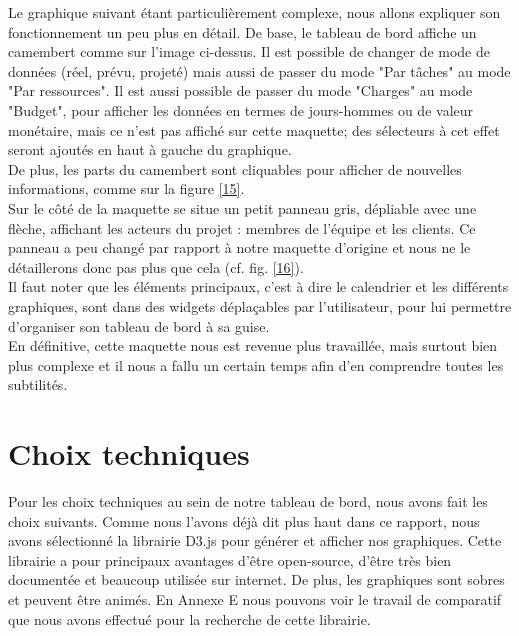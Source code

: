 \documentclass[12pt]{report}
\begin{document}
Le graphique suivant étant particulièrement complexe, nous allons expliquer son fonctionnement un peu plus en détail. De base, le tableau de bord affiche un camembert comme sur l'image ci-dessus. Il est possible de changer de mode de données (réel, prévu, projeté) mais aussi de passer du mode "Par tâches" au mode "Par ressources". Il est aussi possible de passer du mode "Charges" au mode "Budget", pour afficher les données en termes de jours-hommes ou de valeur monétaire, mais ce n'est pas affiché sur cette maquette; des sélecteurs à cet effet seront ajoutés en haut à gauche du graphique.\\

De plus, les parts du camembert sont cliquables pour afficher de nouvelles informations, comme sur la figure \ref{15}.\\

Sur le côté de la maquette se situe un petit panneau gris, dépliable avec une flèche, affichant les acteurs du projet : membres de l'équipe et les clients. Ce panneau a peu changé par rapport à notre maquette d'origine et nous ne le détaillerons donc pas plus que cela (cf. fig. \ref{16}).\\


Il faut noter que les éléments principaux, c'est à dire le calendrier et les différents graphiques, sont dans des widgets déplaçables par l'utilisateur, pour lui permettre d'organiser son tableau de bord à sa guise.\\


En définitive, cette maquette nous est revenue plus travaillée, mais surtout bien plus complexe et il nous a fallu un certain temps afin d'en comprendre toutes les subtilités.\\


	\section{Choix techniques}
	
	Pour les choix techniques au sein de notre tableau de bord, nous avons fait les choix suivants. Comme nous l’avons déjà dit plus haut dans ce rapport, nous avons sélectionné la librairie D3.js pour générer et afficher nos graphiques. Cette librairie a pour principaux avantages d’être open-source, d’être très bien documentée et beaucoup utilisée sur internet. De plus, les graphiques sont sobres et peuvent être animés. En Annexe E nous pouvons voir le travail de comparatif que nous avons effectué pour la recherche de cette librairie.\\
\end{document}
